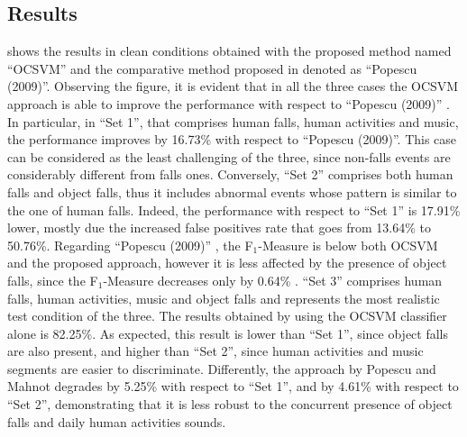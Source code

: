 \subsection{Results}
\label{sec:ocsvm_results}
 shows the results in clean conditions obtained with the proposed method named ``OCSVM'' and the comparative method proposed in \cite{Popescu2009} denoted as ``Popescu (2009)''. Observing the figure, it is evident that in all the three cases the OCSVM approach is able to improve the performance with respect to ``Popescu (2009)'' \cite{Popescu2009}. In particular, in ``Set 1'', that comprises human falls, human activities and music, the performance improves by 16.73\% with respect to ``Popescu (2009)''. This case can be considered as the least challenging of the three, since non-falls events are considerably different from falls ones. Conversely, ``Set 2'' comprises both human falls and object falls, thus it includes abnormal events whose pattern is similar to the one of human falls. Indeed, the performance with respect to ``Set 1'' is 17.91\% lower, mostly due the increased false positives rate that goes from 13.64\% to 50.76\%. Regarding ``Popescu (2009)'' \cite{Popescu2009}, the F$_1$-Measure is below both OCSVM and the proposed approach, however it is less affected by the presence of object falls, since the F$_1$-Measure decreases only by 0.64\% . ``Set 3'' comprises human falls, human activities, music and object falls and represents the most realistic test condition of the three. The results obtained by using  the OCSVM classifier alone is 82.25\%. As expected, this result is lower than ``Set 1'', since object falls are also present, and higher than ``Set 2'', since human activities and music segments are easier to discriminate.  Differently, the approach by Popescu and Mahnot \cite{Popescu2009} degrades by 5.25\% with respect to ``Set 1'', and by 4.61\% with respect to ``Set 2'', demonstrating that it is less robust to the concurrent presence of object falls and daily human activities sounds. 

